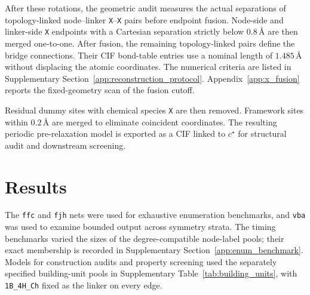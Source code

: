 \documentclass[a5paper, 10pt]{article}
\begin{document}
After these rotations, the geometric audit measures the actual separations of topology-linked node--linker \texttt{X}--\texttt{X} pairs before endpoint fusion. Node-side and linker-side \texttt{X} endpoints with a Cartesian separation strictly below $0.8\,\text{\AA}$ are then merged one-to-one. After fusion, the remaining topology-linked pairs define the bridge connections. Their CIF bond-table entries use a nominal length of $1.485\,\text{\AA}$ without displacing the atomic coordinates. The numerical criteria are listed in Supplementary Section~\ref{app:reconstruction_protocol}. Appendix~\ref{app:x_fusion} reports the fixed-geometry scan of the fusion cutoff.

\begingroup\setlength{\emergencystretch}{1em}
Residual dummy sites with chemical species \texttt{X} are then removed. Framework sites within $0.2\,\text{\AA}$ are merged to eliminate coincident coordinates. The resulting periodic pre-relaxation model is exported as a CIF linked to $c^\star$ for structural audit and downstream screening.
\par\endgroup

\section{Results}

The \texttt{ffc} and \texttt{fjh} nets were used for exhaustive enumeration benchmarks, and \texttt{vba} was used to examine bounded output across symmetry strata. The timing benchmarks varied the sizes of the degree-compatible node-label pools; their exact membership is recorded in Supplementary Section~\ref{app:enum_benchmark}. Models for construction audits and property screening used the separately specified building-unit pools in Supplementary Table~\ref{tab:building_units}, with \texttt{1B\_4H\_Ch} fixed as the linker on every edge.
\end{document}

